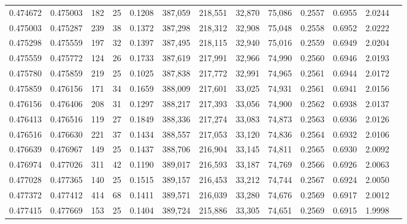 \begin{tabular}{rrrrrrrrrrrrr}
0.474672 & 0.475003 &   182 &  25 &                                     0.1208 & 387,059 & 218,551 &  32,870 &  75,086 & 0.2557 & 0.6955 & 2.0244 \\
0.475003 & 0.475287 &   239 &  38 &                                     0.1372 & 387,298 & 218,312 &  32,908 &  75,048 & 0.2558 & 0.6952 & 2.0222 \\
0.475298 & 0.475559 &   197 &  32 &                                     0.1397 & 387,495 & 218,115 &  32,940 &  75,016 & 0.2559 & 0.6949 & 2.0204 \\
0.475559 & 0.475772 &   124 &  26 &                                     0.1733 & 387,619 & 217,991 &  32,966 &  74,990 & 0.2560 & 0.6946 & 2.0193 \\
0.475780 & 0.475859 &   219 &  25 &                                     0.1025 & 387,838 & 217,772 &  32,991 &  74,965 & 0.2561 & 0.6944 & 2.0172 \\
0.475859 & 0.476156 &   171 &  34 &                                     0.1659 & 388,009 & 217,601 &  33,025 &  74,931 & 0.2561 & 0.6941 & 2.0156 \\
0.476156 & 0.476406 &   208 &  31 &                                     0.1297 & 388,217 & 217,393 &  33,056 &  74,900 & 0.2562 & 0.6938 & 2.0137 \\
0.476413 & 0.476516 &   119 &  27 &                                     0.1849 & 388,336 & 217,274 &  33,083 &  74,873 & 0.2563 & 0.6936 & 2.0126 \\
0.476516 & 0.476630 &   221 &  37 &                                     0.1434 & 388,557 & 217,053 &  33,120 &  74,836 & 0.2564 & 0.6932 & 2.0106 \\
0.476639 & 0.476967 &   149 &  25 &                                     0.1437 & 388,706 & 216,904 &  33,145 &  74,811 & 0.2565 & 0.6930 & 2.0092 \\
0.476974 & 0.477026 &   311 &  42 &                                     0.1190 & 389,017 & 216,593 &  33,187 &  74,769 & 0.2566 & 0.6926 & 2.0063 \\
0.477028 & 0.477365 &   140 &  25 &                                     0.1515 & 389,157 & 216,453 &  33,212 &  74,744 & 0.2567 & 0.6924 & 2.0050 \\
0.477372 & 0.477412 &   414 &  68 &                                     0.1411 & 389,571 & 216,039 &  33,280 &  74,676 & 0.2569 & 0.6917 & 2.0012 \\
0.477415 & 0.477669 &   153 &  25 &                                     0.1404 & 389,724 & 215,886 &  33,305 &  74,651 & 0.2569 & 0.6915 & 1.9998 \\

\end{tabular}
